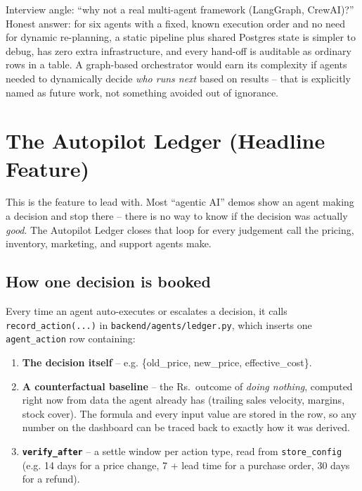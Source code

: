 \documentclass[11pt,a4paper]{article}
\newcommand{\Rs}{Rs.\,}
\begin{document}
\begin{qabox}{Interview angle: ``why not a real multi-agent framework (LangGraph, CrewAI)?''}
Honest answer: for six agents with a fixed, known execution order and no need for dynamic
re-planning, a static pipeline plus shared Postgres state is simpler to debug, has zero extra
infrastructure, and every hand-off is auditable as ordinary rows in a table. A graph-based
orchestrator would earn its complexity if agents needed to dynamically decide \emph{who runs
next} based on results -- that is explicitly named as future work, not something avoided out
of ignorance.
\end{qabox}

\section{The Autopilot Ledger (Headline Feature)}
\label{sec:ledger}

This is the feature to lead with. Most ``agentic AI'' demos show an agent making a decision and
stop there -- there is no way to know if the decision was actually \emph{good}. The Autopilot
Ledger closes that loop for every judgement call the pricing, inventory, marketing, and support
agents make.

\subsection{How one decision is booked}
Every time an agent auto-executes or escalates a decision, it calls
\texttt{record\_action(...)} in \texttt{backend/agents/ledger.py}, which inserts one
\texttt{agent\_action} row containing:
\begin{enumerate}[itemsep=2pt]
  \item \textbf{The decision itself} -- e.g. \{old\_price, new\_price, effective\_cost\}.
  \item \textbf{A counterfactual baseline} -- the \Rs{} outcome of \emph{doing nothing},
  computed right now from data the agent already has (trailing sales velocity, margins, stock
  cover). The formula and every input value are stored in the row, so any number on the
  dashboard can be traced back to exactly how it was derived.
  \item \textbf{\texttt{verify\_after}} -- a settle window per action type, read from
  \texttt{store\_config} (e.g. 14 days for a price change, 7 + lead time for a purchase order,
  30 days for a refund).
\end{enumerate}
\end{document}
